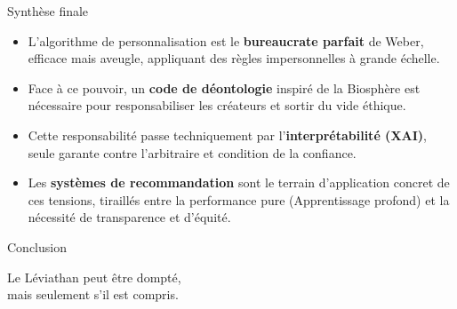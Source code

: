 \documentclass[9pt, aspectratio=169]{beamer}
\begin{document}
\begin{frame}{Synthèse finale}
    \begin{itemize}
        \item L'algorithme de personnalisation est le \textbf{bureaucrate parfait} de Weber, efficace mais aveugle, appliquant des règles impersonnelles à grande échelle.
        \item Face à ce pouvoir, un \textbf{code de déontologie} inspiré de la Biosphère est nécessaire pour responsabiliser les créateurs et sortir du vide éthique.
        \item Cette responsabilité passe techniquement par l'\textbf{interprétabilité (XAI)}, seule garante contre l'arbitraire et condition de la confiance.
        \item Les \textbf{systèmes de recommandation} sont le terrain d'application concret de ces tensions, tiraillés entre la performance pure (Apprentissage profond) et la nécessité de transparence et d'équité.
    \end{itemize}
\end{frame}

\begin{frame}{Conclusion}
    \begin{center}
        \Huge Le Léviathan peut être dompté, \\ mais seulement s'il est compris.
    \end{center}
\end{frame}
\end{document}
